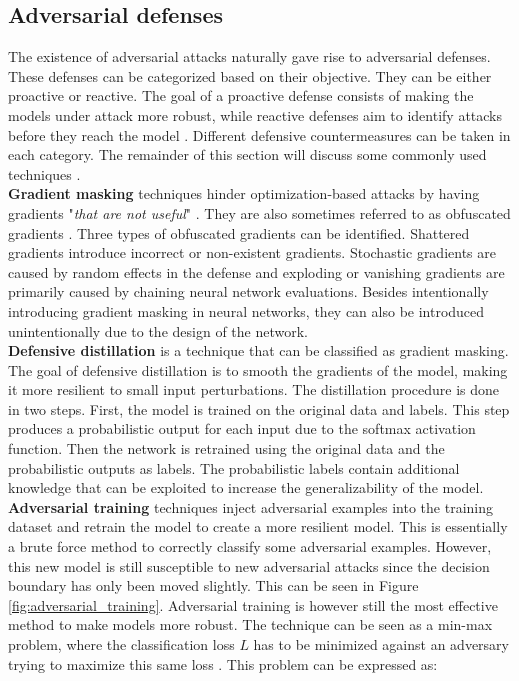 \subsection{Adversarial defenses}\label{sec:adversarial_defenses}
The existence of adversarial attacks naturally gave rise to adversarial defenses. These defenses can be categorized based on their objective. They can be either proactive or reactive. The goal of a proactive defense consists of making the models under attack more robust, while reactive defenses aim to identify attacks before they reach the model \cite{adversarial_defense_survey}. Different defensive countermeasures can be taken in each category. The remainder of this section will discuss some commonly used techniques \cite{defenses_survey}.\\

\textbf{Gradient masking} techniques hinder optimization-based attacks by having gradients "\textit{that are not useful}" \cite{not_useful_gradients}. They are also sometimes referred to as obfuscated gradients \cite{obfuscated_gradients}. Three types of obfuscated gradients can be identified. Shattered gradients introduce incorrect or non-existent gradients. Stochastic gradients are caused by random effects in the defense and exploding or vanishing gradients are primarily caused by chaining neural network evaluations. Besides intentionally introducing gradient masking in neural networks, they can also be introduced unintentionally due to the design of the network.\\

\textbf{Defensive distillation}  \cite{defensive_distillation} is a technique that can be classified as gradient masking. The goal of defensive distillation is to smooth the gradients of the model, making it more resilient to small input perturbations. The distillation procedure is done in two steps. First, the model is trained on the original data and labels. This step produces a probabilistic output for each input due to the softmax activation function. Then the network is retrained using the original data and the probabilistic outputs as labels. The probabilistic labels contain additional knowledge that can be exploited to increase the generalizability of the model.\\

\textbf{Adversarial training} \cite{FGSM} techniques inject adversarial examples into the training dataset and retrain the model to create a more resilient model. This is essentially a brute force method to correctly classify some adversarial examples. However, this new model is still susceptible to new adversarial attacks since the decision boundary has only been moved slightly. This can be seen in Figure \ref{fig:adversarial_training}. Adversarial training is however still the most effective method to make models more robust. The technique can be seen as a min-max problem, where the classification loss $L$ has to be minimized against an adversary trying to maximize this same loss \cite{huang}. This problem can be expressed as:

